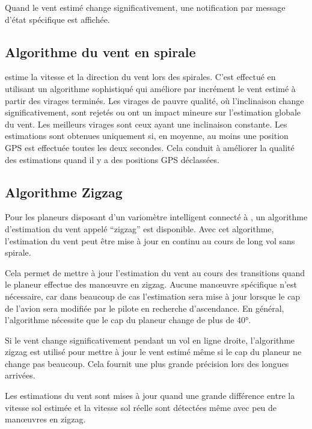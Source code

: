 Quand le vent estimé change significativement, une notification par message d'état spécifique est affichée.

\subsection*{Algorithme du vent en spirale}

\xc{} estime la vitesse et la direction du vent lors des spirales.
C'est effectué en utilisant un algorithme sophistiqué qui améliore par incrément le vent estimé à partir des virages terminés.
Les virages de pauvre qualité, où l'inclinaison change significativement, sont rejetés ou ont un impact mineure sur l'estimation globale du vent.
Les meilleurs virages sont ceux ayant une inclinaison constante.
Les estimations sont obtenues uniquement si, en moyenne, au moins une position GPS est effectuée toutes les deux secondes.
Cela conduit à améliorer la qualité des estimations quand il y a des positions GPS déclassées.


\subsection*{Algorithme Zigzag}

Pour les planeurs disposant d'un variomètre intelligent connecté à \xc, un algorithme d'estimation du vent appelé ``zigzag'' est disponible.
Avec cet algorithme, l'estimation du vent peut être mise à jour en continu au cours de long vol sans spirale.

Cela permet de mettre à jour l'estimation du vent au cours des transitions quand le planeur effectue des manœuvre en zigzag.
Aucune manœuvre spécifique n'est nécessaire, car dans beaucoup de cas l'estimation sera mise à jour lorsque le cap de l'avion sera modifiée par le pilote en recherche d'ascendance.
En général, l'algorithme nécessite que le cap du planeur change de plus de 40°.

Si le vent change significativement pendant un vol en ligne droite, l'algorithme zigzag est utilisé pour mettre à jour le vent estimé même si le cap du planeur ne change pas beaucoup.
Cela fournit une plus grande précision lors des longues arrivées.

Les estimations du vent sont mises à jour quand une grande différence entre la vitesse sol estimée et la vitesse sol réelle sont détectées même avec peu de manœuvres en zigzag.

